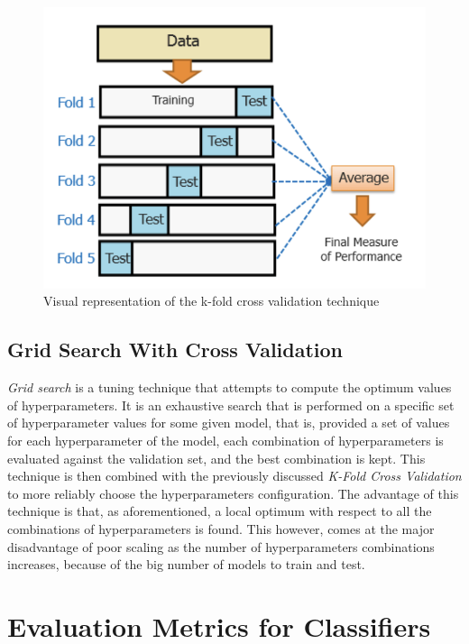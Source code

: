 \begin{figure}[h]
    \centering
    \includegraphics[scale=0.75]{images/train-val-test/cross-val.png}
    \caption{Visual representation of the k-fold cross validation technique}
    \label{fig:train_val_test_cross_val}
\end{figure}

\subsection{Grid Search With Cross Validation}

\textit{Grid search} is a tuning technique that attempts to compute the optimum values of hyperparameters. It is an exhaustive search that is performed on a specific set of hyperparameter values for some given model, that is, provided a set of values for each hyperparameter of the model, each combination of hyperparameters is evaluated against the validation set, and the best combination is kept. This technique is then combined with the previously discussed \textit{K-Fold Cross Validation} to more reliably choose the hyperparameters configuration.
The advantage of this technique is that, as aforementioned, a local optimum with respect to all the combinations of hyperparameters is found. This however, comes at the major disadvantage of poor scaling as the number of hyperparameters combinations increases, because of the big number of models to train and test.


\break
\section{Evaluation Metrics for Classifiers}

